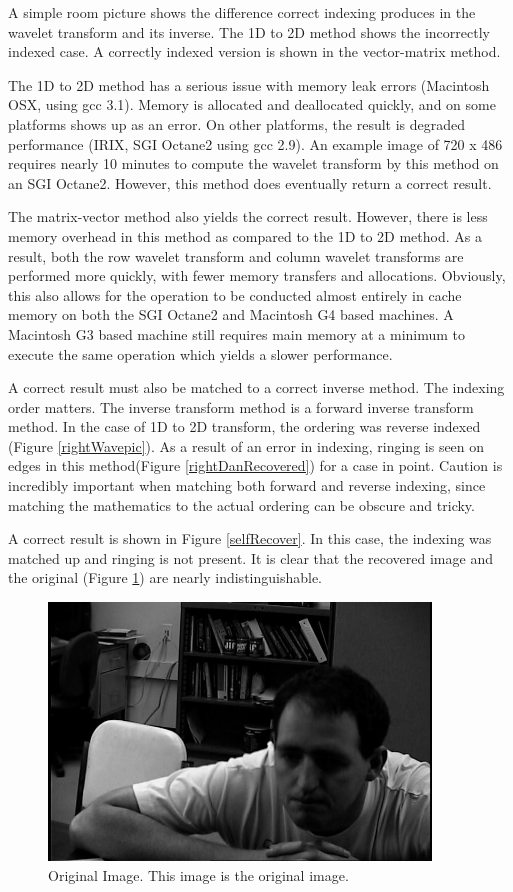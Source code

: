 A simple room picture shows the difference correct indexing produces in the wavelet transform and its inverse. The 1D to 2D method shows the incorrectly indexed case.  A correctly indexed version is shown in the vector-matrix method.  

The 1D to 2D method has a serious issue with memory leak errors (Macintosh OSX, using gcc 3.1).  Memory is allocated and deallocated quickly, and on some platforms shows up as an error.   On other platforms, the result is degraded performance (IRIX, SGI Octane2 using gcc 2.9).   An example image of 720 x 486 requires nearly 10 minutes to compute the wavelet transform by this method on an SGI Octane2.  However, this method does eventually return a correct result.  

The matrix-vector method also yields the correct result.  However, there is less memory overhead in this method as compared to the 1D to 2D method.  As a result, both the row wavelet transform and column wavelet transforms are performed more quickly, with fewer memory transfers and allocations.  Obviously, this also allows for the operation to be conducted almost entirely in cache memory on both the SGI Octane2 and Macintosh G4 based machines.  A Macintosh G3 based machine still requires main memory at a minimum to execute the same operation which yields a slower performance.  

A correct result must also be matched to a correct inverse method.  The indexing order matters.  The inverse transform method is a forward inverse transform method.  In the case of 1D to 2D transform, the ordering was reverse indexed (Figure \ref{rightWavepic}).  As a result of an error in indexing, ringing is seen on edges in this method(Figure \ref{rightDanRecovered}) for a case in point.  Caution is incredibly important when matching both forward and reverse indexing, since matching the mathematics to the actual ordering can be obscure and tricky.   

A correct result is shown in Figure \ref{selfRecover}.  In this case, the indexing was matched up and ringing is not present.  It is clear that the recovered image and the original (Figure \ref{rightDan}) are nearly indistinguishable.  

\begin{figure}[htb]
\begin{center}
\includegraphics [width=4in]{rightDan.jpg}
\end{center}
\caption{Original Image.  This image is the original image. }
\label{rightDan}
\end{figure}

